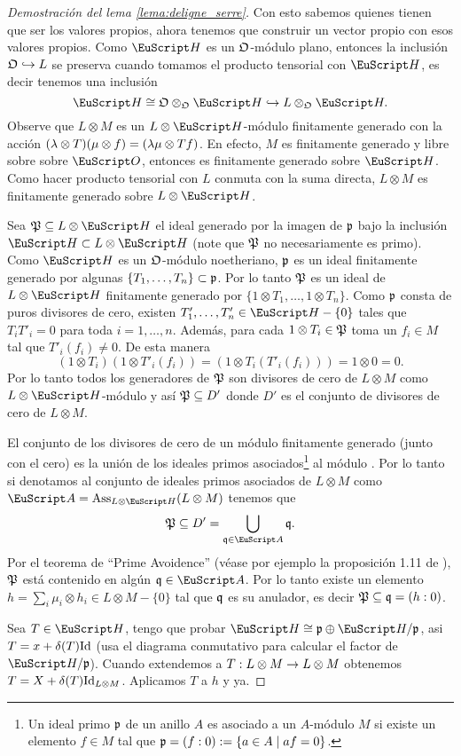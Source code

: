 \documentclass[../../tesis_maestria]{subfiles}
\begin{document}
\begin{proof}[Demostraci\'on del lema \ref{lema:deligne_serre}]
  Con esto sabemos quienes tienen que ser los valores propios, ahora tenemos que construir un vector propio con esos valores propios. Como $\Hh$ es un $\mathfrak{O}$-m\'odulo plano, entonces la inclusi\'on $\mathfrak{O}\hookrightarrow L$ se preserva cuando tomamos el producto tensorial con $\Hh$, es decir tenemos una inclusi\'on
  \[
    \Hh\cong\fO\otimes_{\fO}\Hh\hookrightarrow L\otimes_{\fO}\Hh.
  \]
Observe que $L\otimes M$ es un $L\otimes\Hh$-m\'odulo finitamente generado con la acci\'on $(\lambda\otimes T)(\mu\otimes f)=(\lambda\mu\otimes Tf)$. En efecto, $M$ es finitamente generado y libre sobre sobre $\Oo$, entonces es finitamente generado sobre $\Hh$. Como hacer producto tensorial con $L$ conmuta con la suma directa, $L\otimes M$ es finitamente generado sobre $L\otimes\Hh$.

Sea $\fP\subseteq L\otimes\Hh$ el ideal generado por la imagen de $\mathfrak{p}$ bajo la inclusi\'on $\Hh\subset L\otimes\Hh$ (note que $\mathfrak{P}$ no necesariamente es primo). Como $\Hh$ es un $\mathfrak{O}$-m\'odulo noetheriano, $\mathfrak{p}$ es un ideal finitamente generado por algunas $\{T_1,\dots,T_n\}\subset\mathfrak{p}$. Por lo tanto $\mathfrak{P}$ es un ideal de $L\otimes\Hh$ finitamente generado por $\{1\otimes T_1,\ldots,1\otimes T_n\}$. Como $\mathfrak{p}$ consta de puros divisores de cero, existen $T'_1,\ldots,T'_n\in\Hh-\{0\}$ tales que $T_iT'_i=0$ para toda $i=1,\ldots,n$. Adem\'as, para cada $1\otimes T_i\in\mathfrak{P}$ toma un $f_i\in M$ tal que $T'_i(f_i)\neq 0$. De esta manera
\[
  (1\otimes T_i)(1\otimes T'_i(f_i))=(1\otimes T_i(T'_i(f_i)))=1\otimes 0=0.
\]
Por lo tanto todos los generadores de $\mathfrak{P}$ son divisores de cero de $L\otimes M$ como $L\otimes\Hh$-m\'odulo y as\'i $\mathfrak{P}\subseteq D'$ donde $D'$ es el conjunto de divisores de cero de $L\otimes M$.

  El conjunto de los divisores de cero de un m\'odulo finitamente generado (junto con el cero) es la uni\'on de los ideales primos asociados\footnote{Un ideal primo $\mathfrak{p}$ de un anillo $A$ es asociado a un $A$-m\'odulo $M$ si existe un elemento $f\in M$ tal que $\mathfrak{p}=(f:0):=\{a\in A \mid af=0\}$.} al m\'odulo \cite[teorema 3.1, pg 89]{EisenbudCAWAVTAG}. Por lo tanto si denotamos al conjunto de ideales primos asociados de $L\otimes M$ como $\Aa=\mathrm{Ass}_{L\otimes\Hh}(L\otimes M)$ tenemos que
\[
  \fP \subseteq D'=\bigcup_{\q\in \Aa}\q.
\]
Por el teorema de ``Prime Avoidence'' (v\'ease por ejemplo la proposici\'on 1.11 de \cite{AtiyahCA}), $\mathfrak{P}$ est\'a contenido en alg\'un $\q\in\Aa$. Por lo tanto existe un elemento $h=\sum_i\mu_i\otimes h_i\in L\otimes M-\{0\}$ tal que $\mathfrak{q}$ es su anulador, es decir $\mathfrak{P}\subseteq\mathfrak{q}=(h:0)$.

Sea $T\in\Hh$, tengo que probar $\Hh\cong\p\oplus\Hh/\p$, asi $T=x+\delta(T)\mathrm{Id}$ (usa el diagrama conmutativo para calcular el factor de $\Hh/\p$). Cuando extendemos a $T:L\otimes M\rightarrow L\otimes M$ obtenemos $T=X+\delta(T)\mathrm{Id}_{L\otimes M}$. Aplicamos $T$ a $h$ y ya.
\end{proof}
\end{document}
